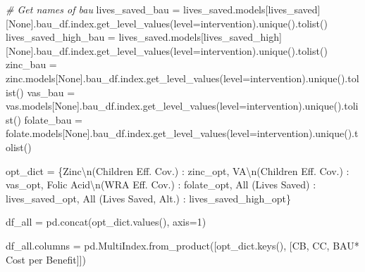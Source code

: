 \documentclass[
]{article}
\newenvironment{Shaded}{}{}
\newcommand{\CharTok}[1]{\textcolor[rgb]{0.25,0.44,0.63}{#1}}
\newcommand{\CommentTok}[1]{\textcolor[rgb]{0.38,0.63,0.69}{\textit{#1}}}
\newcommand{\DecValTok}[1]{\textcolor[rgb]{0.25,0.63,0.44}{#1}}
\newcommand{\NormalTok}[1]{#1}
\newcommand{\OperatorTok}[1]{\textcolor[rgb]{0.40,0.40,0.40}{#1}}
\newcommand{\StringTok}[1]{\textcolor[rgb]{0.25,0.44,0.63}{#1}}
\newcommand{\VariableTok}[1]{\textcolor[rgb]{0.10,0.09,0.49}{#1}}
\begin{document}
\begin{Shaded}
\begin{Highlighting}[numbers=left,,]
\CommentTok{\# Get names of bau}
\NormalTok{lives\_saved\_bau }\OperatorTok{=}\NormalTok{ lives\_saved.models[}\StringTok{\textquotesingle{}lives\_saved\textquotesingle{}}\NormalTok{][}\VariableTok{None}\NormalTok{].bau\_df.index.get\_level\_values(level}\OperatorTok{=}\StringTok{\textquotesingle{}intervention\textquotesingle{}}\NormalTok{).unique().tolist()}
\NormalTok{lives\_saved\_high\_bau }\OperatorTok{=}\NormalTok{ lives\_saved.models[}\StringTok{\textquotesingle{}lives\_saved\_high\textquotesingle{}}\NormalTok{][}\VariableTok{None}\NormalTok{].bau\_df.index.get\_level\_values(level}\OperatorTok{=}\StringTok{\textquotesingle{}intervention\textquotesingle{}}\NormalTok{).unique().tolist()}
\NormalTok{zinc\_bau }\OperatorTok{=}\NormalTok{ zinc.models[}\VariableTok{None}\NormalTok{].bau\_df.index.get\_level\_values(level}\OperatorTok{=}\StringTok{\textquotesingle{}intervention\textquotesingle{}}\NormalTok{).unique().tolist()}
\NormalTok{vas\_bau }\OperatorTok{=}\NormalTok{ vas.models[}\VariableTok{None}\NormalTok{].bau\_df.index.get\_level\_values(level}\OperatorTok{=}\StringTok{\textquotesingle{}intervention\textquotesingle{}}\NormalTok{).unique().tolist()}
\NormalTok{folate\_bau }\OperatorTok{=}\NormalTok{ folate.models[}\VariableTok{None}\NormalTok{].bau\_df.index.get\_level\_values(level}\OperatorTok{=}\StringTok{\textquotesingle{}intervention\textquotesingle{}}\NormalTok{).unique().tolist()}

\NormalTok{opt\_dict }\OperatorTok{=}\NormalTok{ \{}\StringTok{\textquotesingle{}Zinc}\CharTok{\textbackslash{}n}\StringTok{(Children Eff. Cov.)\textquotesingle{}}\NormalTok{ : zinc\_opt,}
\StringTok{\textquotesingle{}VA}\CharTok{\textbackslash{}n}\StringTok{(Children Eff. Cov.)\textquotesingle{}}\NormalTok{ : vas\_opt,}
\StringTok{\textquotesingle{}Folic Acid}\CharTok{\textbackslash{}n}\StringTok{(WRA Eff. Cov.)\textquotesingle{}}\NormalTok{ : folate\_opt,}
\StringTok{\textquotesingle{}All (Lives Saved)\textquotesingle{}}\NormalTok{ : lives\_saved\_opt,}
\StringTok{\textquotesingle{}All (Lives Saved, Alt.)\textquotesingle{}}\NormalTok{ : lives\_saved\_high\_opt\}}

\NormalTok{df\_all }\OperatorTok{=}\NormalTok{ pd.concat(opt\_dict.values(), axis}\OperatorTok{=}\DecValTok{1}\NormalTok{)}

\NormalTok{df\_all.columns }\OperatorTok{=}\NormalTok{ pd.MultiIndex.from\_product([opt\_dict.keys(), [}\StringTok{\textquotesingle{}CB\textquotesingle{}}\NormalTok{, }\StringTok{\textquotesingle{}CC\textquotesingle{}}\NormalTok{, }\StringTok{\textquotesingle{}BAU* Cost per Benefit\textquotesingle{}}\NormalTok{]])}
\end{Highlighting}
\end{Shaded}
\end{document}
